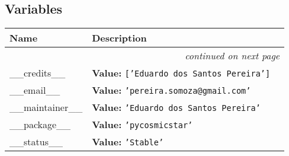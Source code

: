   \subsection{Variables}

    \vspace{-1cm}
\hspace{\varindent}\begin{longtable}{|p{\varnamewidth}|p{\vardescrwidth}|l}
\cline{1-2}
\cline{1-2} \centering \textbf{Name} & \centering \textbf{Description}& \\
\cline{1-2}
\endhead\cline{1-2}\multicolumn{3}{r}{\small\textit{continued on next page}}\\\endfoot\cline{1-2}
\endlastfoot\raggedright \_\-\_\-c\-r\-e\-d\-i\-t\-s\-\_\-\_\- & \raggedright \textbf{Value:} 
{\tt \texttt{[}\texttt{'}\texttt{Eduardo dos Santos Pereira}\texttt{'}\texttt{]}}&\\
\cline{1-2}
\raggedright \_\-\_\-e\-m\-a\-i\-l\-\_\-\_\- & \raggedright \textbf{Value:} 
{\tt \texttt{'}\texttt{pereira.somoza@gmail.com}\texttt{'}}&\\
\cline{1-2}
\raggedright \_\-\_\-m\-a\-i\-n\-t\-a\-i\-n\-e\-r\-\_\-\_\- & \raggedright \textbf{Value:} 
{\tt \texttt{'}\texttt{Eduardo dos Santos Pereira}\texttt{'}}&\\
\cline{1-2}
\raggedright \_\-\_\-p\-a\-c\-k\-a\-g\-e\-\_\-\_\- & \raggedright \textbf{Value:} 
{\tt \texttt{'}\texttt{pycosmicstar}\texttt{'}}&\\
\cline{1-2}
\raggedright \_\-\_\-s\-t\-a\-t\-u\-s\-\_\-\_\- & \raggedright \textbf{Value:} 
{\tt \texttt{'}\texttt{Stable}\texttt{'}}&\\
\cline{1-2}
\end{longtable}


